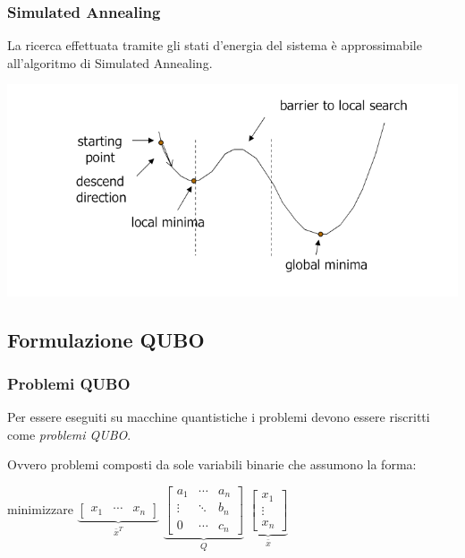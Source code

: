 \documentclass[10pt]{beamer}
\begin{document}
\begin{frame}
  \frametitle{Simulated Annealing}

  La ricerca effettuata tramite gli stati d'energia del sistema è approssimabile all'algoritmo di Simulated Annealing.

  \includegraphics[width=\columnwidth]{img/simulated-annealing}

\end{frame}
\subsection{Formulazione QUBO}
\begin{frame}
  \frametitle{Problemi QUBO}

  Per essere eseguiti su macchine quantistiche i problemi devono essere riscritti come \emph{problemi QUBO}.

  Ovvero problemi composti da sole variabili binarie che assumono la forma:

  \begin{center}
    minimizzare 
    $\underbrace{\begin{bmatrix}
        x_1 & \cdots & x_n 
    \end{bmatrix}}_{\bar{x}^T}$ 
    $\underbrace{\begin{bmatrix}
        a_1 & \cdots & a_n \\
        \vdots & \ddots & b_n \\
        0 & \cdots & c_n 
    \end{bmatrix}}_{Q}$ 
    $\underbrace{\begin{bmatrix}
        x_1 \\
        \vdots \\
        x_n 
    \end{bmatrix}}_{\bar{x}}$       
  \end{center}

\end{frame}
\end{document}
